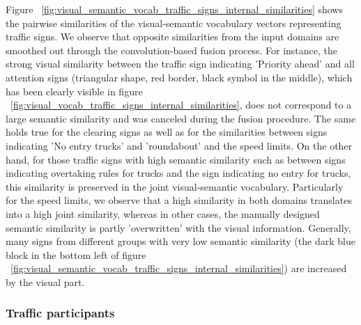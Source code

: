 Figure ~\ref{fig:visual_semantic_vocab_traffic_signs_internal_similarities} shows the pairwise similarities of the visual-semantic vocabulary vectors representing traffic signs.
We observe that opposite similarities from the input domains are smoothed out through the convolution-based fusion process.
For instance, the strong visual similarity between the traffic sign indicating 'Priority ahead' and all attention signs (triangular shape, red border, black symbol in the middle), which has been clearly visible in figure ~\ref{fig:visual_vocab_traffic_signs_internal_similarities}, does not correspond to a large semantic similarity and was canceled during the fusion procedure.
The same holds true for the clearing signs as well as for the similarities between signs indicating 'No entry trucks' and 'roundabout' and the speed limits.
On the other hand, for those traffic signs with high semantic similarity such as between signs indicating overtaking rules for trucks and the sign indicating no entry for trucks, this similarity is preserved in the joint visual-semantic vocabulary. 
Particularly for the speed limits, we observe that a high similarity in both domains translates into a high joint similarity, whereas in other cases, the manually designed semantic similarity is partly 'overwritten' with the visual information.
Generally, many signs from different groups with very low semantic similarity (the dark blue block in the bottom left of figure ~\ref{fig:visual_semantic_vocab_traffic_signs_internal_similarities}) are increased by the visual part. 

\subsubsection{Traffic participants}%
\label{ssubsec:traffic_participants}

